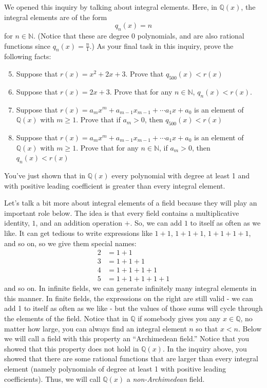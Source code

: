 \documentclass[11pt]{article}
\newenvironment{task}
	{\begin{mdframed}[linecolor=lightgray, linewidth=3pt]\raggedright}
	{\end{mdframed}}
\theoremstyle{definition}
\begin{document}
\begin{task}
We opened this inquiry by talking about integral elements. Here, in $\mathbb{Q}(x)$, the integral elements are of the form
\[ q_n(x) = n \]
for $n\in\mathbb{N}$. (Notice that these are degree 0 polynomials, and are also rational functions since $q_n(x) = \frac{n}{1}$.) As your final task in
this inquiry, prove the following facts:

\begin{enumerate}
    \setcounter{enumi}{4}
  \item Suppose that $r(x) =  x^2 + 2x + 3$. Prove that $q_{500}(x) < r(x)$
  \item Suppose that $r(x) =  2x + 3$. Prove that for any $n\in\mathbb{N}$, $q_n(x) < r(x)$.
  \item Suppose that $r(x) =  a_mx^m + a_{m-1}x_{m-1}+\cdots a_1x + a_0$ is an element
    of $\mathbb{Q}(x)$ with $m \geq 1$. Prove that if $a_m > 0$, then $q_{500}(x) < r(x)$
  \item Suppose that $r(x) =  a_mx^m + a_{m-1}x_{m-1}+\cdots a_1x + a_0$ is an element
    of $\mathbb{Q}(x)$ with $m \geq 1$. Prove that for any $n\in\mathbb{N}$, if $a_m > 0$, then $q_{n}(x) < r(x)$
\end{enumerate}

You've just shown that in $\mathbb{Q}(x)$ every polynomial with degree at least 1 and with positive leading coefficient is greater than every integral
element. 
\end{task}

Let's talk a bit more about integral elements of a field because they will play an important role below.  The idea is that every field contains
a multiplicative identity, $1$, and an addition operation $+$. So, we can add $1$ to itself as often as we like. It can get tedious to write
expressions like $1+1$, $1+1+1$, $1+1+1+1$, and so on, so we give them special names:
\begin{align*}
  2 &= 1 + 1\\
  3 &= 1 + 1 + 1\\
  4 &= 1 + 1 + 1 + 1\\
  5 &= 1 + 1 + 1 + 1 + 1
\end{align*}
and so on. In infinite fields, we can generate infinitely many integral elements in this manner. In finite fields, the expressions on the right 
are still valid - we can add 1 to itself as often as we like - but the values of those sums will cycle through the elements of the field. Notice
that in $\mathbb{Q}$ if somebody gives you any $x\in\mathbb{Q}$, no matter how large, you can always find an integral element $n$ so that
$x < n$.  Below we will call a field with this property an ``Archimedean field.'' Notice that you showed that this property does not hold in $\mathbb{Q}(x)$. 
In the inquiry above, you showed that there are some rational functions that are larger than every integral element (namely polynomials of degree at 
least 1 with positive leading coefficients). Thus, we will call $\mathbb{Q}(x)$ a \textit{non-Archimedean} field.
\end{document}
